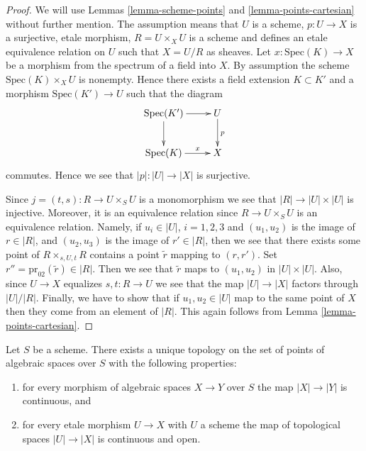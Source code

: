 \begin{proof}
We will use Lemmas \ref{lemma-scheme-points} and \ref{lemma-points-cartesian}
without further mention.
The assumption means that $U$ is a scheme, $p : U \to X$ is a
surjective, etale morphism, $R = U \times_X U$ is a scheme
and defines an etale equivalence relation on $U$ such that
$X = U/R$ as sheaves. Let $x : \text{Spec}(K) \to X$ be a morphism
from the spectrum of a field into $X$. By assumption the scheme
$\text{Spec}(K) \times_X U$ is nonempty. Hence there exists a
field extension $K \subset K'$ and a morphism $\text{Spec}(K') \to U$
such that the diagram
$$
\xymatrix{
\text{Spec}(K') \ar[r] \ar[d] & U \ar[d]^p \\
\text{Spec}(K) \ar[r]^-x & X
}
$$
commutes. Hence we see that $|p| : |U| \to |X|$ is surjective.

\medskip\noindent
Since $j = (t, s) : R \to U \times_S U$ is a monomorphism we see that
$|R| \to |U| \times |U|$ is injective. Moreover, it is an equivalence
relation since $R \to U \times_S U$ is an equivalence relation.
Namely, if $u_i \in |U|$, $i = 1, 2, 3$ and $(u_1, u_2)$ is
the image of $r \in |R|$, and $(u_2, u_3)$ is the image of
$r' \in |R|$, then we see that there exists some point of
$R \times_{s, U, t} R$ contains a point $\tilde r$ mapping to
$(r, r')$. Set $r'' = \text{pr}_{02}(\tilde r) \in |R|$. Then we
see that $\tilde r$ maps to $(u_1, u_2)$ in $|U| \times |U|$.
Also, since $U \to X$ equalizes $s, t : R \to U$ we see that
the map $|U| \to |X|$ factors through $|U|/|R|$. Finally, we have
to show that if $u_1, u_2 \in |U|$ map to the same point of $X$
then they come from an element of $|R|$.
This again follows from Lemma \ref{lemma-points-cartesian}.
\end{proof}

\begin{lemma}
\label{lemma-topology-points}
Let $S$ be a scheme. There exists a unique topology on the set of points
of algebraic spaces over $S$ with the following properties:
\begin{enumerate}
\item for every morphism of algebraic spaces $X \to Y$ over $S$
the map $|X| \to |Y|$ is continuous, and
\item for every etale morphism $U \to X$ with $U$ a scheme
the map of topological spaces $|U| \to |X|$ is continuous and open.
\end{enumerate}
\end{lemma}


